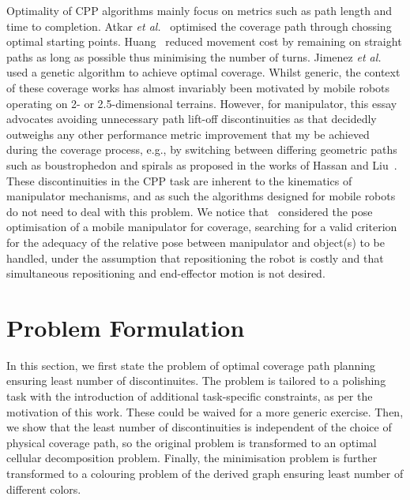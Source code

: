 \documentclass[journal]{IEEEtran}
\begin{document}
Optimality of CPP algorithms mainly focus on metrics such as path length and time to completion.
Atkar \textit{et al.}~\cite{Atkar2003Towards} optimised the coverage path through chossing optimal starting points. 
Huang~\cite{huang2001optimal} reduced movement cost by remaining on straight paths as long as possible thus minimising the number of turns. 
Jimenez \textit{et al.}~\cite{jimenez2007optimal} used a genetic algorithm to achieve optimal coverage. 
Whilst generic, the context of these coverage works has almost invariably been motivated by mobile robots operating on 2- or 2.5-dimensional terrains. However, for manipulator, this essay advocates avoiding unnecessary path lift-off discontinuities as that decidedly outweighs any other performance metric improvement that my be achieved during the coverage process, e.g., by switching between differing geometric paths such as boustrophedon and spirals as proposed in the works of Hassan and Liu~\cite{hassan2018a}. 
These discontinuities in the CPP task are inherent to the kinematics of manipulator mechanisms, and as such the algorithms designed for mobile robots do not need to deal with this problem. 
We notice that~\cite{paus2017a} considered the pose 
optimisation of a mobile manipulator for coverage, searching for a valid criterion for the adequacy of the relative pose between manipulator and object(s) to be handled, under the assumption that repositioning the robot is costly and that simultaneous repositioning and end-effector motion is not desired. 

\section{Problem Formulation}\label{sectionproblemformulation}
In this section, we first state the problem of optimal coverage path planning ensuring least number of discontinuites.
The problem is tailored to a polishing task with the introduction of additional task-specific constraints, as per the motivation of this work. These could be waived for a more generic exercise. %
Then, we show that the least number of discontinuities is independent of the choice of physical coverage path, 
so the original problem is transformed to an optimal cellular decomposition problem. 
Finally, the minimisation problem is further transformed to a colouring problem of the derived graph ensuring least number of different colors. 
\end{document}
